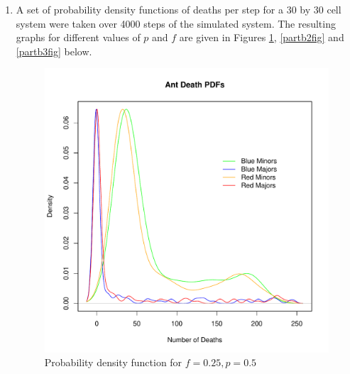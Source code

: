 \begin{enumerate}
\item A set of probability density functions of deaths per step for a 30 by 30 
cell system were taken over 4000 steps of the simulated system.  The resulting
graphs for different values of $p$ and $f$ are given in Figures \ref{partb1fig},
\ref{partb2fig} and \ref{partb3fig} below. \\

\begin{figure}[h!]
\centering
\includegraphics[scale=0.80]{partb1v1.pdf}
\caption{Probability density function for $f = 0.25, p = 0.5$}
\label{partb1fig}
\end{figure}


\end{enumerate}
